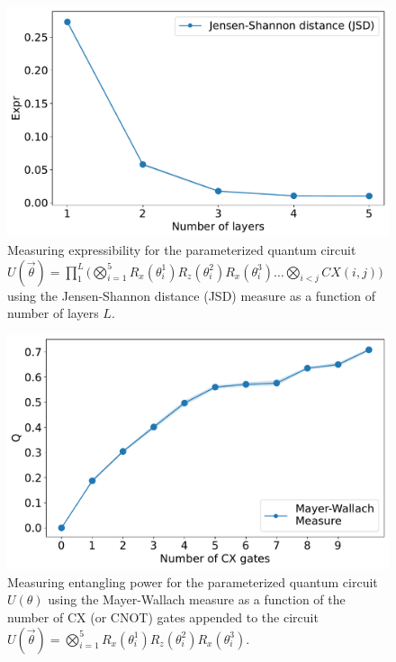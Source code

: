 \documentclass[%
 reprint,
 amsmath,
 amssymb,
 showkeys,
 pra,
 floatfix,
]{revtex4-2}
\begin{document}
\begin{figure}[!t]
    \centering
    \includegraphics[width=\linewidth]{images/expressibility-measure.pdf}
    \caption[Visualizing entanglement spectrum for parameterized quantum circuits]{Measuring expressibility for the parameterized quantum circuit $U(\vec{\theta}) =  \prod_{1}^{L}\big(\bigotimes_{i=1}^{5}R_x(\theta_i^1)R_z(\theta_i^2)R_x(\theta_i^3) \ldots \bigotimes_{i<j}CX(i, j)\big)$ using the Jensen-Shannon distance (JSD) measure as a function of number of layers $L$. }
    \label{fig:expressibility-measure}
\end{figure}

\begin{figure}[!t]
    \centering
    \includegraphics[width=\linewidth]{images/entanglement-capability.pdf}
    \caption[Visualizing entanglement spectrum for parameterized quantum circuits]{Measuring entangling power for the parameterized quantum circuit $U(\theta)$ using the Mayer-Wallach measure as a function of the number of CX (or CNOT) gates appended to the circuit $U(\vec{\theta}) = \bigotimes_{i=1}^{5}R_x(\theta_i^1)R_z(\theta_i^2)R_x(\theta_i^3)$.}
    \label{fig:entanglement-capability}
\end{figure}
\end{document}
